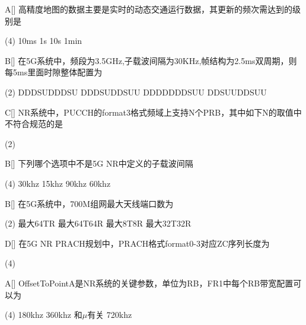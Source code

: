 \begin{choice}{A}[]
    高精度地图的数据主要是实时的动态交通运行数据，其更新的频次需达到的级别是
    \begin{tasks}(4)
        \task 10ms
        \task 1s
        \task 10s
        \task 1min
    \end{tasks}
\end{choice}


\begin{choice}{B}[]
    在5G系统中，频段为3.5GHz,子载波间隔为30KHz,帧结构为2.5ms双周期，则每5ms里面时隙整体配置为
    \begin{tasks}(2)
        \task DDDSUDDDSU
        \task DDDSUDDSUU
        \task DDDDDDDSUU
        \task DDSUUDDSUU
    \end{tasks}
\end{choice}


\begin{choice}{C}[]
    NR系统中，PUCCH的format3格式频域上支持N个PRB，其中如下N的取值中不符合规范的是
    \begin{tasks}(2)
    \end{tasks}
\end{choice}

\begin{choice}{B}[]
    下列哪个选项中不是5G NR中定义的子载波间隔
    \begin{tasks}(4)
        \task 30khz
        \task 15khz
        \task 90khz
        \task 60khz
    \end{tasks}
\end{choice}

\begin{choice}{B}[]
    在5G系统中，700M组网最大天线端口数为
    \begin{tasks}(2)
        \task 最大64TR
        \task 最大64T64R
        \task 最大8T8R
        \task 最大32T32R
    \end{tasks}
\end{choice}



\begin{choice}{D}[]
    在5G NR PRACH规划中，PRACH格式format0-3对应ZC序列长度为
    \begin{tasks}(4)
    \end{tasks}
\end{choice}

\begin{choice}{A}[]
    OffsetToPointA是NR系统的关键参数，单位为RB，FR1中每个RB带宽配置可以为
    \begin{tasks}(4)
        \task 180khz
        \task 360khz
        \task 和$μ$有关
        \task 720khz
    \end{tasks}
\end{choice}


